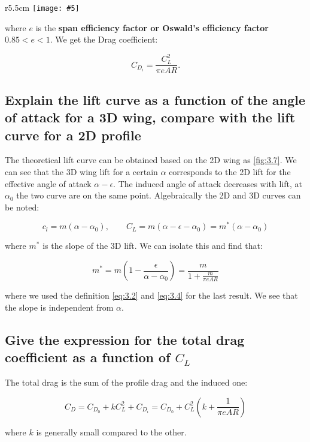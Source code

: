 \documentclass[british,french,11pt, a4paper, openany]{article}
\newcommand{\wrapfig}[6]{%
	\begin{wrapfigure}[#1]{#2}{#3cm}%
		\vspace{-5mm}%
		\texttt{[image: \#5]}%
		\captionof{figure}{}%
		\label{#6}%
	\end{wrapfigure}%
}
\begin{document}
\wrapfig{10}{r}{5.5}{0.1}{ch3/7}{fig:3.7}
where $e$ is the \textbf{span efficiency factor or Oswald's efficiency factor} $0.85<e<1$. We get the Drag coefficient:

\begin{equation}
C_{D_i} =  \frac{C_L^2}{\pi e AR} .
\end{equation}

\subsection{Explain the lift curve as a function of the angle of attack for a 3D wing, compare with the lift curve for a 2D profile}
The theoretical lift curve can be obtained based on the 2D wing as \autoref{fig:3.7}. We can see that the 3D wing lift for a certain $\alpha$ corresponds to the 2D lift for the effective angle of attack $\alpha - \epsilon$. The induced angle of attack decreases with lift, at $\alpha _0$ the two curve are on the same point. Algebraically the 2D and 3D curves can be noted:

\begin{equation}
c_l = m(\alpha - \alpha _0), \qquad C_L = m(\alpha - \epsilon - \alpha _0) = m^* (\alpha - \alpha _0)
\label{eq:3.4}
\end{equation}

where $m^*$ is the slope of the 3D lift. We can isolate this and find that:

\begin{equation}
m^* = m\left( 1 - \frac{\epsilon}{\alpha - \alpha _0} \right) = \frac{m}{1+\frac{m}{\pi e AR}} 
\end{equation}

where we used the definition \eqref{eq:3.2} and \eqref{eq:3.4} for the last result. We see that the slope is independent from $\alpha$. 

\subsection{Give the expression for the total drag coefficient as a function of $C_L$}

The total drag is the sum of the profile drag and the induced one:

\begin{equation}
C_D = C_{D_0} + kC_L^2 + C_{D_i} = C_{D_0} + C_L^2 \left( k + \frac{1}{\pi e AR}\right)
\end{equation}	 

where $k$ is generally small compared to the other. 
\end{document}
